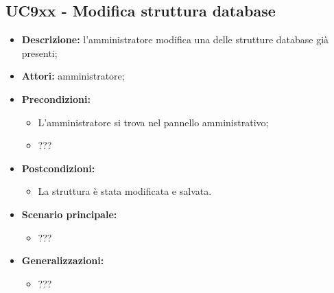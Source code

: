 \documentclass[5pt]{article}
\begin{document}
\subsection{UC9xx - Modifica struttura database}
\label{sec:UC9xxx}
\begin{itemize}
    \item \textbf{Descrizione:}  l’amministratore modifica una delle strutture database già presenti;
    \item \textbf{Attori:} amministratore;
    \item \textbf{Precondizioni:} 
    \begin{itemize}
        \item L’amministratore si trova nel pannello amministrativo;
        \item ???
    \end{itemize}
    \item \textbf{Postcondizioni:} 
    \begin{itemize}
        \item La struttura è stata modificata e salvata.
    \end{itemize}
    \item \textbf{Scenario principale:} 
    \begin{itemize}
        \item ???
    \end{itemize}
    \item \textbf{Generalizzazioni:} 
    \begin{itemize}
        \item ???
    \end{itemize}
\end{itemize}
\end{document}
